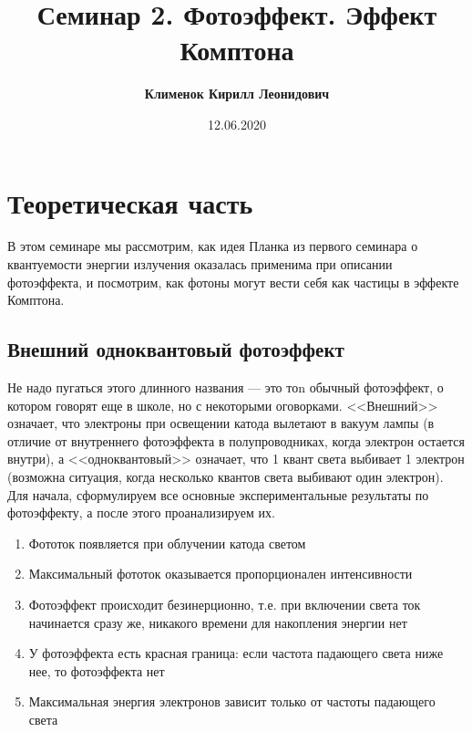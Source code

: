 \documentclass[12pt]{article}
\begin{document}
 

\title{\textbf{Семинар 2. Фотоэффект. Эффект Комптона}}
\author{\textbf{Клименок Кирилл Леонидович}}
\date{12.06.2020}
\maketitle

\section{Теоретическая часть}
В этом семинаре мы рассмотрим, как идея Планка из первого семинара о квантуемости энергии излучения оказалась применима при описании фотоэффекта, и посмотрим, как фотоны могут вести себя как частицы в эффекте Комптона.

\subsection{Внешний одноквантовый фотоэффект}
Не надо пугаться этого длинного названия --- это тоn обычный фотоэффект, о котором говорят еще в школе, но с некоторыми оговорками. <<Внешний>> означает, что электроны при освещении катода вылетают в вакуум лампы (в отличие от внутреннего фотоэффекта в полупроводниках, когда электрон остается внутри), а <<одноквантовый>> означает, что 1 квант света выбивает 1 электрон (возможна ситуация, когда несколько квантов света выбивают один электрон). Для начала, сформулируем все основные экспериментальные результаты по фотоэффекту, а после этого проанализируем их.

\begin{enumerate}
    \item Фототок появляется при облучении катода светом
    \item Максимальный фототок оказывается пропорционален интенсивности
    \item Фотоэффект происходит безинерционно, т.е. при включении света ток начинается сразу же, никакого времени для накопления энергии нет
    \item У фотоэффекта есть красная граница: если частота падающего света ниже нее, то фотоэффекта нет
    \item Максимальная энергия электронов зависит только от частоты падающего света
\end{enumerate}
\end{document}
